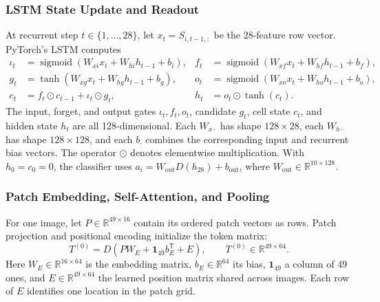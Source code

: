 \subsubsection{LSTM State Update and Readout}
At recurrent step $t\in\{1,\ldots,28\}$, let $x_t=S_{i,t-1,:}$ be the
28-feature row vector. PyTorch's LSTM computes
\begin{equation}
 \begin{aligned}
 \iota_t&=\operatorname{sigmoid}(W_{xi}x_t+W_{hi}h_{t-1}+b_i),&
 f_t&=\operatorname{sigmoid}(W_{xf}x_t+W_{hf}h_{t-1}+b_f),\\
 g_t&=\tanh(W_{xg}x_t+W_{hg}h_{t-1}+b_g),&
 o_t&=\operatorname{sigmoid}(W_{xo}x_t+W_{ho}h_{t-1}+b_o),\\
 c_t&=f_t\odot c_{t-1}+\iota_t\odot g_t,&
 h_t&=o_t\odot\tanh(c_t).
 \end{aligned}\label{eq:meth_lstm}
\end{equation}
The input, forget, and output gates $\iota_t,f_t,o_t$, candidate $g_t$,
cell state $c_t$, and hidden state $h_t$ are all 128-dimensional.
Each $W_{x\cdot}$ has shape $128\times28$, each $W_{h\cdot}$ has shape
$128\times128$, and each $b_{\cdot}$ combines the corresponding input and
recurrent bias vectors. The operator $\odot$ denotes elementwise
multiplication. With $h_0=c_0=0$, the classifier uses
$a_i=W_{\mathrm{out}}D(h_{28})+b_{\mathrm{out}}$, where
$W_{\mathrm{out}}\in\mathbb{R}^{10\times128}$.

\clearpage
\subsubsection{Patch Embedding, Self-Attention, and Pooling}
For one image, let $P\in\mathbb{R}^{49\times16}$ contain its ordered patch
vectors as rows. Patch projection and positional encoding initialize the
token matrix:
\begin{equation}
 T^{(0)}=D(PW_E+\mathbf{1}_{49}b_E^{\mathsf T}+E),\qquad
 T^{(0)}\in\mathbb{R}^{49\times64}.
 \label{eq:meth_embed}
\end{equation}
Here $W_E\in\mathbb{R}^{16\times64}$ is the embedding matrix,
$b_E\in\mathbb{R}^{64}$ its bias, $\mathbf{1}_{49}$ a column of 49 ones,
and $E\in\mathbb{R}^{49\times64}$ the learned position matrix shared
across images. Each row of $E$ identifies one location in the patch grid.

